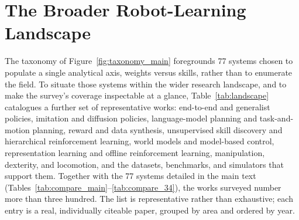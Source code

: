 \appendix
\section{The Broader Robot-Learning Landscape}
\label{sec:landscape}

The taxonomy of Figure~\ref{fig:taxonomy_main} foregrounds 77 systems chosen to populate a single
analytical axis, weights versus skills, rather than to enumerate the field. To situate those systems
within the wider research landscape, and to make the survey's coverage inspectable at a glance,
Table~\ref{tab:landscape} catalogues a further set of representative works: end-to-end and generalist
policies, imitation and diffusion policies, language-model planning and task-and-motion planning,
reward and data synthesis, unsupervised skill discovery and hierarchical reinforcement learning, world
models and model-based control, representation learning and offline reinforcement learning,
manipulation, dexterity, and locomotion, and the datasets, benchmarks, and simulators that support
them. Together with the 77 systems detailed in the main text
(Tables~\ref{tab:compare_main}--\ref{tab:compare_34}), the works surveyed number more than three
hundred. The list is representative rather than exhaustive; each entry is a real, individually
citeable paper, grouped by area and ordered by year.


